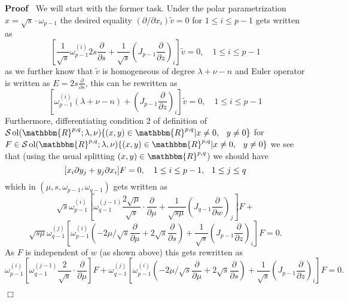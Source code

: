\documentclass[12pt]{article}
\newcommand{\tmop}[1]{\ensuremath{\operatorname{#1}}}
\renewenvironment{proof}{\noindent\textbf{Proof\ }}{\hspace*{\fill}$\Box$\medskip}
\theoremstyle{remark}
\newcommand{\R}{\mathbbm{R}}
\begin{document}
\begin{proof}
  We will start with the former task. Under the polar parametrization $x =
  \sqrt{s} \cdot \omega_{p - 1}$ the desired equality $(\partial / \partial
  x_i)  \tilde{v} = 0$ for $1 \leq i \leq p - 1$ gets written as
  \[ \left[ \frac{1}{\sqrt{s}} \omega_{p - 1}^{(i)} 2 s
     \frac{\partial}{\partial s} + \frac{1}{\sqrt{s}}  \left( J_{p - 1} 
     \frac{\partial}{\partial z} \right)_i \right]  \tilde{v} = 0, \quad 1
     \leq i \leq p - 1 \]
  as we further know that $\tilde{v}$ is homogeneous of degree $\lambda + \nu
  - n$ and Euler operator is written as $E = 2 s \frac{\partial}{\partial s}$,
  this can be rewritten as
  \begin{equation}
    \left[ \omega_{p - 1}^{(i)} (\lambda + \nu - n) + \left( J_{p - 1} 
    \frac{\partial}{\partial z} \right)_i \right]  \tilde{v} = 0, \quad 1 \leq
    i \leq p - 1 \label{eq:sing-q-dx}
  \end{equation}
  Furthermore, differentiating condition 2 of definition of $\mathcal{S}
  \tmop{ol} (\R^{p, q} ; \lambda, \nu)\{(x, y) \in \R^{p, q} |x \neq 0,
  \hspace{0.75em} y \neq 0\}$ for $F \in \mathcal{S} \tmop{ol} (\R^{p, q} ;
  \lambda, \nu)\{(x, y) \in \R^{p, q} |x \neq 0, \hspace{0.75em} y \neq 0\}$
  we see that (using the usual splitting $(x, y) \in \R^{p, q}$) we should
  have
  \[ [x_i \partial y_j + y_j \partial x_i] F = 0, \quad 1 \le i \le p - 1,
     \hspace{0.75em} 1 \leq j \leq q \]
  which in $(\mu, s, \omega_{p - 1}, \omega_{q - 1})$ gets written as
  \[ \sqrt{s} \omega^{(i)}_{p - 1}  \left[ \omega^{(j - 1)}_{q - 1}  \frac{2
     \sqrt{\mu}}{\sqrt{s}} \cdot \frac{\partial}{\partial \mu} +
     \frac{1}{\sqrt{s \mu}}  \left( J_{q - 1}  \frac{\partial}{\partial w}
     \right)_j \right] F + \]
  \[ \sqrt{s \mu} \omega^{(j)}_{q - 1}  \left[ \omega_{p - 1}^{(i)}  \left( -
     2 \mu / \sqrt{s}  \frac{\partial}{\partial \mu} + 2 \sqrt{s} 
     \frac{\partial}{\partial s} \right) + \frac{1}{\sqrt{s}}  \left( J_{p -
     1}  \frac{\partial}{\partial z} \right)_i \right] F = 0. \]
  As $F$ is independent of $w$ (as shown above) this gets rewritten as
  \[ \omega^{(i)}_{p - 1}  \left[ \omega^{(j - 1)}_{q - 1}  \frac{2}{\sqrt{s}}
     \cdot \frac{\partial}{\partial \mu} \right] F + \omega^{(j)}_{q - 1} 
     \left[ \omega_{p - 1}^{(i)}  \left( - 2 \mu / \sqrt{s} 
     \frac{\partial}{\partial \mu} + 2 \sqrt{s}  \frac{\partial}{\partial s}
     \right) + \frac{1}{\sqrt{s}}  \left( J_{p - 1}  \frac{\partial}{\partial
     z} \right)_i \right] F = 0. \]

\end{proof}
\end{document}
